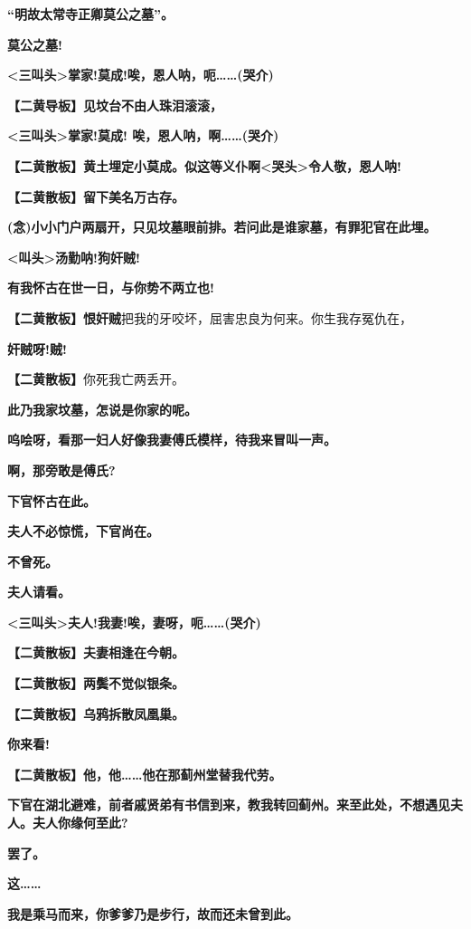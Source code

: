 \textbf{``明故太常寺正卿莫公之墓''。}

\textbf{莫公之墓!}

\textbf{\textless{}三叫头\textgreater{}掌家!莫成!唉，恩人呐，呃\ldots{}\ldots{}(哭介)}

\textbf{【二黄导板】见坟台不由人珠泪滚滚，}

\textbf{\textless{}三叫头\textgreater{}掌家!莫成!
唉，恩人呐，啊\ldots{}\ldots{}(哭介)}

\textbf{【二黄散板】黄土埋定小莫成。似这等义仆啊\textless{}哭头\textgreater{}令人敬，恩人呐!}

\textbf{【二黄散板】留下美名万古存。}

\textbf{(念)小小门户两扇开，只见坟墓眼前排。若问此是谁家墓，有罪犯官在此埋。}

\textbf{\textless{}叫头\textgreater{}汤勤呐!狗奸贼!}

\textbf{有我怀古在世一日，与你势不两立也!}

\textbf{【二黄散板】恨奸贼}把我的牙咬坏，屈害忠良为何来。你生我存冤仇在，

\textbf{奸贼呀!贼!}

\textbf{【二黄散板】}你死我亡两丢开。

\textbf{此乃我家坟墓，怎说是你家的呢。}

\textbf{呜哙呀，看那一妇人好像我妻傅氏模样，待我来冒叫一声。}

\textbf{啊，那旁敢是傅氏?}

\textbf{下官怀古在此。}

\textbf{夫人不必惊慌，下官尚在。}

\textbf{不曾死。}

\textbf{夫人请看。}

\textbf{\textless{}三叫头\textgreater{}夫人!我妻!唉，妻呀，呃\ldots{}\ldots{}(哭介)}

\textbf{【二黄散板】夫妻相逢在今朝。}

\textbf{【二黄散板】两鬓不觉似银条。}

\textbf{【二黄散板】乌鸦拆散凤凰巢。}

\textbf{你来看!}

\textbf{【二黄散板】他，他\ldots{}\ldots{}他在那蓟州堂替我代劳。}

\textbf{下官在湖北避难，前者戚贤弟有书信到来，教我转回蓟州。来至此处，不想遇见夫人。夫人你缘何至此?}

\textbf{罢了。}

\textbf{这\ldots{}\ldots{}}

\textbf{我是乘马而来，你爹爹乃是步行，故而还未曾到此。}

